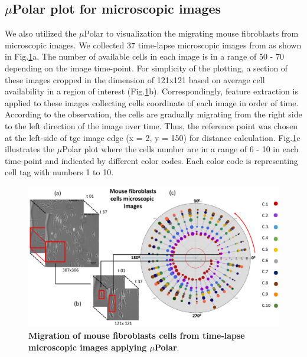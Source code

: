 \documentclass[conference]{IEEEtran}
\begin{document}
\subsection{$\mu$Polar plot for microscopic images}
We also utilized the $\mu$Polar to visualization the migrating mouse fibroblasts from microscopic images. We collected 37 time-lapse microscopic images from \cite{ref05} as shown in Fig.\ref{fig:scopic}a. The number of available cells in each image is in a range of 50 - 70 depending on the image time-point. For simplicity of the plotting, a section of these images cropped in the dimension of 121x121 based on average cell availability in a region of interest (Fig.\ref{fig:scopic}b). Correspondingly, feature extraction is applied to these images collecting cells coordinate of each image in order of time. According to the observation, the cells are gradually migrating from the right side to the left direction of the image over time. Thus, the reference point was chosen at the left-side of tge image edge (x = 2, y = 150) for distance calculation. Fig.\ref{fig:scopic}c illustrates the $\mu$Polar plot where the cells number are in a range of 6 - 10 in each time-point and indicated by different color codes. Each color code is representing cell tag with numbers 1 to 10.  


\begin{figure}
\centering
\includegraphics[width=\textwidth,height=10 cm]{Patterns/microscopic.pdf}
\caption{ \textbf{Migration of mouse fibroblasts cells from time-lapse microscopic images applying $\mu$Polar}.}
\label{fig:scopic}
\end{figure}
\end{document}
